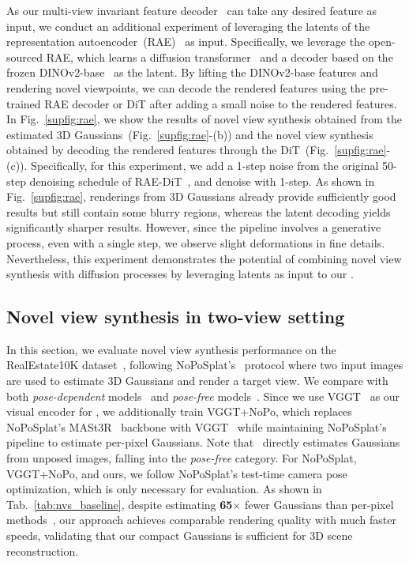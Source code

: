 As our multi-view invariant feature decoder \oursF\ can take any desired feature as input, we conduct an additional experiment of leveraging the latents of the representation autoencoder~(RAE)~\cite{zheng2025diffusion} as input. Specifically, we leverage the open-sourced RAE, which learns a diffusion transformer~\cite{peebles2023scalable} and a decoder based on the frozen DINOv2-base~\cite{oquab2023dinov2} as the latent. By lifting the DINOv2-base features and rendering novel viewpoints, we can decode the rendered features using the pre-trained RAE decoder or DiT after adding a small noise to the rendered features. In Fig.~\ref{supfig:rae}, we show the results of novel view synthesis obtained from the estimated 3D Gaussians~(Fig.~\ref{supfig:rae}-(b)) and the novel view synthesis obtained by decoding the rendered features through the DiT~(Fig.~\ref{supfig:rae}-(c)). Specifically, for this experiment, we add a 1-step noise from the original 50-step denoising schedule of RAE-DiT~\cite{zheng2025diffusion}, and denoise with \mbox{1-step}. As shown in Fig.~\ref{supfig:rae}, renderings from 3D Gaussians already provide sufficiently good results but still contain some blurry regions, whereas the latent decoding yields significantly sharper results. However, since the pipeline involves a generative process, even with a single step, we observe slight deformations in fine details. Nevertheless, this experiment demonstrates the potential of combining novel view synthesis with diffusion processes by leveraging latents as input to our \oursF.

\subsection{Novel view synthesis in two-view setting}
In this section, we evaluate novel view synthesis performance on the RealEstate10K dataset~\cite{zhou2018stereo}, following NoPoSplat's~\cite{ye2024no} protocol where two input images are used to estimate 3D Gaussians and render a target view. We compare with both \textit{pose-dependent} models~\cite{charatan2024pixelsplat, chen2024mvsplat} and \textit{pose-free} models~\cite{hong2024pf3plat,hong2024unifying, smart2024splatt3r, ye2024no,huang2025no}. Since we use VGGT~\cite{wang2025vggt} as our visual encoder for \ours, we additionally train VGGT+NoPo, which replaces NoPoSplat's MASt3R~\cite{leroy2024grounding} backbone with VGGT~\cite{wang2025vggt} while maintaining NoPoSplat's pipeline to estimate per-pixel Gaussians. Note that \ours\ directly estimates Gaussians from unposed images, falling into the \textit{pose-free} category. For NoPoSplat, VGGT+NoPo, and ours, we follow NoPoSplat's test-time camera pose optimization, which is only necessary for evaluation. As shown in Tab.~\ref{tab:nvs_baseline}, despite estimating \textbf{65$\times$} fewer Gaussians than per-pixel methods~\cite{hong2024pf3plat,hong2024unifying, smart2024splatt3r, ye2024no,huang2025no}, our approach achieves comparable rendering quality with much faster speeds, validating that our compact Gaussians is sufficient for 3D scene reconstruction.

